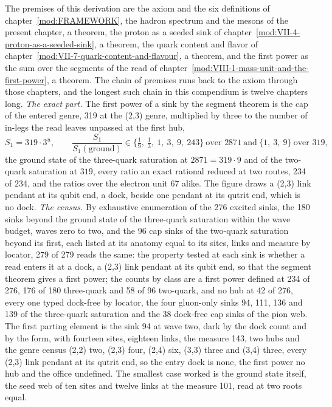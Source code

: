 \begin{chproof}
The premises of this derivation are the axiom and the six definitions of chapter~\ref{mod:FRAMEWORK}, the hadron spectrum and the mesons of the present chapter, a theorem, the proton as a seeded sink of chapter~\ref{mod:VII-4-proton-as-a-seeded-sink}, a theorem, the quark content and flavor of chapter~\ref{mod:VII-7-quark-content-and-flavour}, a theorem, and the first power as the sum over the segments of the read of chapter~\ref{mod:VIII-1-mass-unit-and-the-first-power}, a theorem. The chain of premises runs back to the axiom through those chapters, and the longest such chain in this compendium is twelve chapters long.
\textit{The exact part.} The first power of a sink by the segment theorem is the cap of the entered genre, 319 at the (2,3) genre, multiplied by three to the number of in-legs the read leaves unpassed at the first hub,
\begin{equation} S_{1} = 319\cdot 3^{u}, \qquad \frac{S_{1}}{S_{1}(\text{ground})} \in \Big\{\tfrac{1}{9},\ \tfrac{1}{3},\ 1,\ 3,\ 9,\ 243\Big\} \ \text{over } 2871 \ \text{and} \ \{1,\ 3,\ 9\} \ \text{over } 319, \end{equation}
the ground state of the three-quark saturation at $2871 = 319\cdot 9$ and of the two-quark saturation at $319$, every ratio an exact rational reduced at two routes, 234 of 234, and the ratios over the electron unit 67 alike. The figure draws a (2,3) link pendant at its qubit end, a dock, beside one pendant at its qutrit end, which is no dock.
\textit{The census.} By exhaustive enumeration of the 276 excited sinks, the 180 sinks beyond the ground state of the three-quark saturation within the wave budget, waves zero to two, and the 96 cap sinks of the two-quark saturation beyond its first, each listed at its anatomy equal to its sites, links and measure by locator, 279 of 279 reads the same: the property tested at each sink is whether a read enters it at a dock, a (2,3) link pendant at its qubit end, so that the segment theorem gives a first power; the counts by class are a first power defined at 234 of 276, 176 of 180 three-quark and 58 of 96 two-quark, and no hub at 42 of 276, every one typed dock-free by locator, the four gluon-only sinks 94, 111, 136 and 139 of the three-quark saturation and the 38 dock-free cap sinks of the pion web. The first parting element is the sink 94 at wave two, dark by the dock count and by the form, with fourteen sites, eighteen links, the measure 143, two hubs and the genre census (2,2) two, (2,3) four, (2,4) six, (3,3) three and (3,4) three, every (2,3) link pendant at its qutrit end, so the entry dock is none, the first power no hub and the office undefined. The smallest case worked is the ground state itself, the seed web of ten sites and twelve links at the measure 101, read at two roots equal.

\end{chproof}

